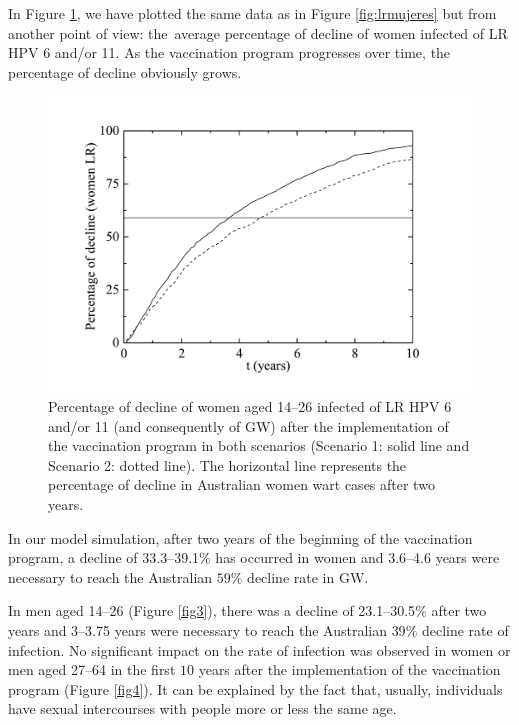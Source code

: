 In Figure \ref{fig2}, we have plotted the same data as in Figure \ref{fig:lrmujeres} but from another point of view: the~average percentage of decline of women infected of LR HPV 6 and/or 11. As the vaccination program progresses over time, the percentage of decline obviously grows. 
\vspace{-24pt}
\begin{figure}[H]
	\centering
	\includegraphics[scale=0.4]{DeclinewomenLR.pdf}
	\vspace{-12pt}
	\caption{Percentage of decline of women aged 14--26 infected of LR HPV 6 and/or 11 (and consequently of GW) after the implementation of the vaccination program in both scenarios (Scenario 1: solid line and Scenario 2: dotted line). The horizontal line represents the percentage of decline in Australian women wart cases after two years.}
	\label{fig2}
\end{figure}

In our model simulation, after two years of the beginning of the vaccination program, a decline of 33.3--39.1$\%$ has occurred in women and 3.6--4.6 years were necessary to reach the Australian $59\%$ decline rate in GW.

In men aged 14--26 (Figure \ref{fig3}), there was a decline of 23.1--30.5$\%$ after two years and 3--3.75 years were necessary to reach the Australian $39\%$ decline rate of infection. No significant impact on the rate of infection was observed in women or men aged 27--64 in the first $10$ years after the implementation of the vaccination program (Figure \ref{fig4}). It can be explained by the fact that, usually, individuals have sexual intercourses with people more or less the same age.

